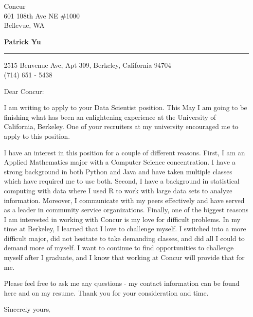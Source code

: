 \documentclass{letter} %
\begin{document}
\signature{Patrick Yu}           %
\longindentation=0pt                       %
\let\raggedleft\raggedright                %
 
 
\begin{letter}{
Concur\\
601 108th Ave NE \#1000\\
Bellevue, WA}

\begin{flushleft}
{\large\bf Patrick Yu}
\end{flushleft}
\medskip\hrule height 1pt
\begin{flushright}
\hfill 2515 Benvenue Ave, Apt 309, Berkeley, California 94704 \\
\hfill (714) 651 - 5438
\end{flushright} 
\vfill %

 
\opening{Dear Concur:} 
 
\noindent I am writing to apply to your Data Scientist position. This May I am going to be finishing what has been an enlightening experience at the University of California, Berkeley.  One of your recruiters at my university encouraged me to apply to this position.

\noindent I have an interest in this position for a couple of different reasons. First, I am an Applied Mathematics major with a Computer Science concentration. I have a strong background in both Python and Java and have taken multiple classes which have required me to use both. Second, I have a background in statistical computing with data where I used R to work with large data sets to analyze information. Moreover, I communicate with my peers effectively and have served as a leader in community service organizations. Finally, one of the biggest reasons I am interested in working with Concur is my love for difficult problems. In my time at Berkeley, I learned that I love to challenge myself. I switched into a more difficult major, did not hesitate to take demanding classes, and did all I could to demand more of myself. I want to continue to find opportunities to challenge myself after I graduate, and I know that working at Concur will provide that for me.

\noindent Please feel free to ask me any questions - my contact information can be found here and on my resume. Thank you for your consideration and time.
 
\closing{Sincerely yours,} 
 

 

\end{letter}
 
\end{document}
